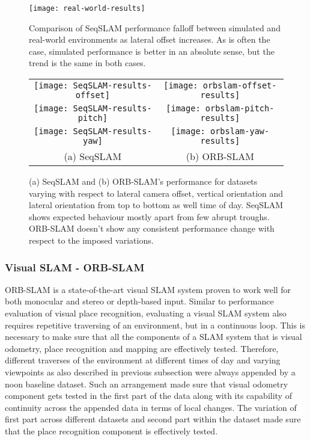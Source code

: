\documentclass{article}
\begin{document}
\begin{figure}[t]
    \centering
    \texttt{[image: real-world-results]}
    \caption{Comparison of SeqSLAM performance falloff between simulated and real-world environments as lateral offset increases. As is often the case, simulated performance is better in an absolute sense, but the trend is the same in both cases.}
    \label{fig:real-world-results}
\end{figure}

\begin{figure}
\centering
\begin{tabular}{cc}
	\texttt{[image: SeqSLAM-results-offset]}&
	\texttt{[image: orbslam-offset-results]}\\
	
	\texttt{[image: SeqSLAM-results-pitch]}&	
	\texttt{[image: orbslam-pitch-results]}\\
	
	\texttt{[image: SeqSLAM-results-yaw]}&
	\texttt{[image: orbslam-yaw-results]}\\
	
	(a) SeqSLAM & (b) ORB-SLAM \\
\end{tabular}
	\caption{ (a) SeqSLAM and (b) ORB-SLAM's performance for datasets varying with respect to lateral camera offset, vertical orientation and lateral orientation from top to bottom as well time of day. SeqSLAM shows expected behaviour mostly apart from few abrupt troughs. ORB-SLAM doesn't show any consistent performance change with respect to the imposed variations.}
	\label{fig:slamCharacterize}
\end{figure}

\subsubsection{Visual SLAM - ORB-SLAM}
ORB-SLAM is a state-of-the-art visual SLAM system proven to work well for both monocular and stereo or depth-based input. Similar to performance evaluation of visual place recognition, evaluating a visual SLAM system also requires repetitive traversing of an environment, but in a continuous loop. This is necessary to make sure that all the components of a SLAM system that is visual odometry, place recognition and mapping are effectively tested. Therefore, different traverses of the environment at different times of day and varying viewpoints as also described in previous subsection were always appended by a noon baseline dataset. Such an arrangement made sure that visual odometry component gets tested in the first part of the data along with its capability of continuity across the appended data in terms of local changes. The variation of first part across different datasets and second part within the dataset made sure that the place recognition component is effectively tested.
\end{document}
